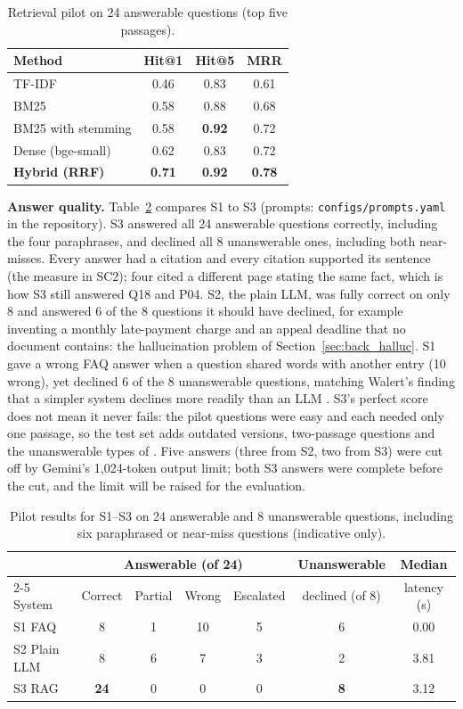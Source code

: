 \documentclass[12pt,nonacm,acmlarge,titlepage,screen]{acmart}
\begin{document}
\begin{table}[H]
\caption{Retrieval pilot on 24 answerable questions (top five passages).}
\label{tab:pilot_ret}
\footnotesize
\begin{tabular}{lccc}
\toprule
Method & Hit@1 & Hit@5 & MRR \\
\midrule
TF-IDF & 0.46 & 0.83 & 0.61 \\
BM25 & 0.58 & 0.88 & 0.68 \\
BM25 with stemming & 0.58 & \textbf{0.92} & 0.72 \\
Dense (bge-small) & 0.62 & 0.83 & 0.72 \\
\textbf{Hybrid (RRF)} & \textbf{0.71} & \textbf{0.92} & \textbf{0.78} \\
\bottomrule
\end{tabular}
\end{table}

\textbf{Answer quality.} Table~\ref{tab:pilot_sys} compares S1 to S3 (prompts: \texttt{configs/prompts.yaml} in the repository). S3 answered all 24 answerable questions correctly, including the four paraphrases, and declined all 8 unanswerable ones, including both near-misses. Every answer had a citation and every citation supported its sentence (the measure in SC2); four cited a different page stating the same fact, which is how S3 still answered Q18 and P04. S2, the plain LLM, was fully correct on only 8 and answered 6 of the 8 questions it should have declined, for example inventing a monthly late-payment charge and an appeal deadline that no document contains: the hallucination problem of Section~\ref{sec:back_halluc}. S1 gave a wrong FAQ answer when a question shared words with another entry (10 wrong), yet declined 6 of the 8 unanswerable questions, matching Walert's finding that a simpler system declines more readily than an LLM \cite{cherumanal2024walert}. S3's perfect score does not mean it never fails: the pilot questions were easy and each needed only one passage, so the test set adds outdated versions, two-passage questions and the unanswerable types of \citet{peng2025unanswerability}. Five answers (three from S2, two from S3) were cut off by Gemini's 1,024-token output limit; both S3 answers were complete before the cut, and the limit will be raised for the evaluation.

\begin{table}[H]
\caption{Pilot results for S1--S3 on 24 answerable and 8 unanswerable questions, including six paraphrased or near-miss questions (indicative only).}
\label{tab:pilot_sys}
\footnotesize
\begin{tabular}{lcccccc}
\toprule
& \multicolumn{4}{c}{Answerable (of 24)} & Unanswerable & Median \\
\cmidrule(lr){2-5}
System & Correct & Partial & Wrong & Escalated & declined (of 8) & latency (s) \\
\midrule
S1 FAQ & 8 & 1 & 10 & 5 & 6 & 0.00 \\
S2 Plain LLM & 8 & 6 & 7 & 3 & 2 & 3.81 \\
S3 RAG & \textbf{24} & 0 & 0 & 0 & \textbf{8} & 3.12 \\
\bottomrule
\end{tabular}
\end{table}
\end{document}
